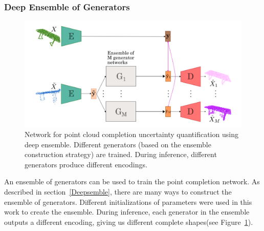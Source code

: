         \subsubsection{Deep Ensemble of Generators}
        \begin{figure}[htb]
          \begin{center}
          \includegraphics[width=\linewidth]{figures/ensemble_network.png}
          \end{center}
          \caption{Network for point cloud completion uncertainty quantification using deep ensemble. Different generators (based on the ensemble construction strategy) are trained. During inference, different generators produce different encodings.}\label{fig:ens_net}
        \end{figure}
        An ensemble of generators can be used to train the point completion network. As described in section~\ref{Deepsemble}, there are many ways to construct the ensemble of generators. Different initializations of parameters were used in this work to create the ensemble. During inference, each generator in the ensemble outputs a different encoding, giving us different complete shapes(see Figure~\ref{fig:ens_net}).

